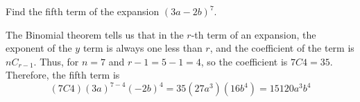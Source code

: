 \begin{example}
    Find the fifth term of the expansion \( (3a-2b)^7 \).
\end{example}
\begin{solution}
    The Binomial theorem tells us that in the \( r \)-th term of an expansion, the exponent of the \( y \) term is always one less than \( r \), and the coefficient of the term is \( nC_{r-1} \). Thus, for \( n = 7 \) and \( r - 1 = 5 - 1 = 4 \), so the coefficient is \( 7C4 = 35 \). Therefore, the fifth term is
    \[
        (7C4)(3a)^{7-4}(-2b)^4 = 35(27a^3)(16b^4) = 15120 a^3 b^4
    \]
\end{solution}
